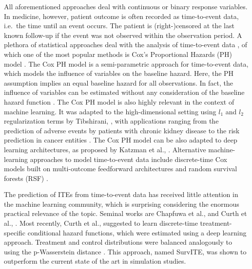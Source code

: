 \documentclass{article}
\begin{document}
	All aforementioned approaches deal with continuous or binary response variables. In medicine, however, patient outcome is often recorded as time-to-event data, i.e.~the time until an event occurs. The patient is (right-)censored at the last known follow-up if the event was not observed within the observation period. A plethora of statistical approaches deal with the analysis of time-to-event data \cite{Martinussen.2006}, of which one of the most popular methods is Cox's Proportional Hazards (PH) model \cite{Cox.1972}. The Cox PH model is a semi-parametric approach for time-to-event data, which models the influence of variables on the baseline hazard. Here, the PH assumption implies an equal baseline hazard for all observations. In fact, the influence of variables can be estimated without any consideration of the baseline hazard function \cite{Cox.1972,Breslow.1972}. The Cox PH model is also highly relevant in the context of machine learning. It was adapted to the high-dimensional setting using $l_1$ and $l_2$ regularization terms by Tibshirani, , with applications ranging from the prediction of adverse events by patients with chronic kidney disease \cite{Zacharias.2021} to the risk prediction in cancer entities \cite{Jachimowicz.2021,Staiger.2020}. The Cox PH model can be also adapted to deep learning architectures, as proposed by Katzman et al., . Alternative machine-learning approaches to model time-to-event data include discrete-time Cox models built on multi-outcome feedforward architectures \cite{Lee.2018,Gensheimer.2019,Kvamme.2019} and random survival forests (RSF) \cite{Ishwaran.2008,Athey.2019}.
	
	The prediction of ITEs from time-to-event data has received little attention in the machine learning community, which is surprising considering the enormous practical relevance of the topic. Seminal works are Chapfuwa et al.,  and Curth et al., . Most recently, Curth et al.,  suggested to learn discrete-time treatment-specific conditional hazard functions, which were estimated using a deep learning approach. Treatment and control distributions were balanced analogously to \cite{Shalit.2016} using the p-Wasserstein distance \cite{Kantorovitch.1958, Ramdas.2017}. 
	This approach, named SurvITE, was shown to outperform the current state of the art in simulation studies. %
	
\end{document}
